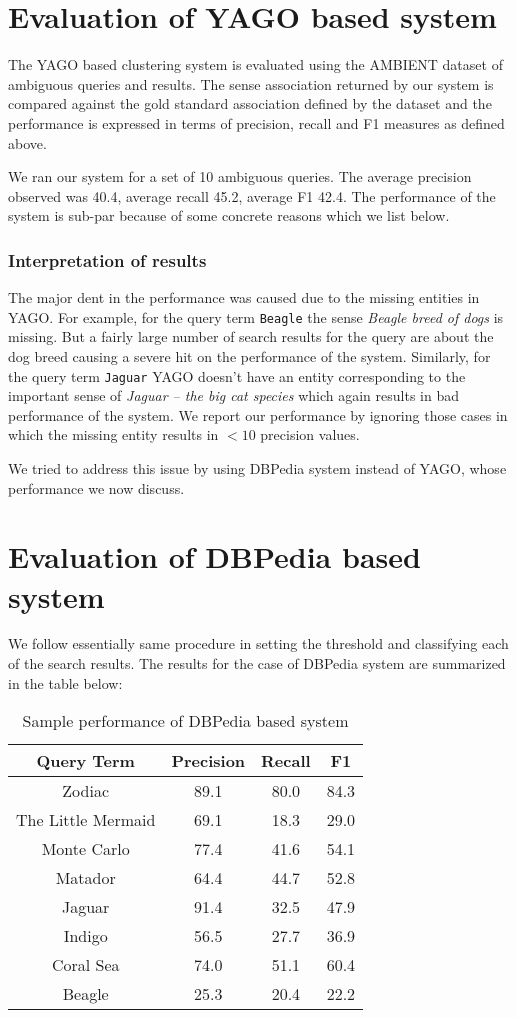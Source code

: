 \documentclass[a4paper,12pt]{report}
\begin{document}
\section{Evaluation of YAGO based system} 
The YAGO based clustering system is evaluated using the AMBIENT
dataset of ambiguous queries and results. The sense association
returned by our system is compared against the gold standard
association defined by the dataset and the performance is expressed in
terms of precision, recall and F1 measures as defined above.

We ran our system for a set of 10 ambiguous queries. The average
precision observed was 40.4, average recall 45.2, average F1 42.4. The
performance of the system is sub-par because of some concrete reasons
which we list below.

\subsubsection{Interpretation of results}
The major dent in the performance was caused due to the missing
entities in YAGO. For example, for the query term {\tt Beagle} the
sense {\it Beagle breed of dogs} is missing. But a fairly large number
of search results for the query are about the dog breed causing a
severe hit on the performance of the system. Similarly, for the query
term {\tt Jaguar} YAGO doesn't have an entity corresponding to the
important sense of {\it Jaguar -- the big cat species} which again
results in bad performance of the system. We report our performance by
ignoring those cases in which the missing entity results in $ < 10$
precision values. 

We tried to address this issue by using DBPedia system instead of
YAGO, whose performance we now discuss.

\section{Evaluation of DBPedia based system}
We follow essentially same procedure in setting the threshold and
classifying each of the search results. The results for the case of
DBPedia system are summarized in the table below:


\begin{table}[h]
\centering
\begin{tabular} {|c | c | c | c|}
  \hline
  Query Term & Precision & Recall & F1 \\
  \hline
  Zodiac & 89.1 & 80.0 & 84.3 \\
  The Little Mermaid & 69.1 & 18.3 & 29.0 \\
  Monte Carlo & 77.4 & 41.6 & 54.1 \\
  Matador & 64.4 & 44.7 & 52.8 \\
  Jaguar & 91.4 & 32.5 & 47.9 \\
  Indigo & 56.5 & 27.7 & 36.9 \\
  Coral Sea & 74.0 & 51.1 & 60.4 \\
  Beagle & 25.3 & 20.4 & 22.2 \\
  \hline
\end{tabular}
\caption{Sample performance of DBPedia based system}
\end{table}
\end{document}
